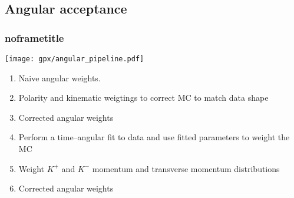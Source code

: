 \documentclass[aspectratio=43]{beamer}
\begin{document}







\subsection{Angular acceptance}



\begin{frame}[default] %
\frametitle{noframetitle}

\begin{center}
  \centering \texttt{[image: gpx/angular\_pipeline.pdf]}
\end{center}

\begin{enumerate}
  \item Naive angular weights.
  \item Polarity and kinematic weigtings to correct MC to match data shape
  \item Corrected angular weights
  \item Perform a time--angular fit to data and use fitted parameters to weight the MC
  \item Weight $K^+$ and $K^-$ momentum and transverse momentum distributions
  \item Corrected angular weights
\end{enumerate}

\end{frame} %
\end{document}
